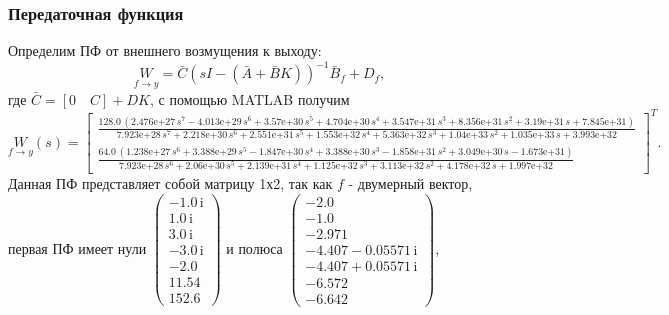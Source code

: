 \subsubsection{Передаточная функция}

Определим ПФ от внешнего возмущения к выходу:
\begin{equation*}
    \underset{f\rightarrow y}{W}=\bar C(sI-(\bar A+\bar BK))^{-1}\bar B_f+D_f,
\end{equation*}
где $\bar C=[0\quad C] + DK$, с помощью MATLAB получим
\begin{equation*}
    \underset{f\rightarrow y}{W}(s)=\begin{bmatrix}
\frac{128.0\,{\left(\text{2.476e+27}\,s^7 -\text{4.013e+29}\,s^6 +\text{3.57e+30}\,s^5 +\text{4.704e+30}\,s^4 +\text{3.547e+31}\,s^3 +\text{8.356e+31}\,s^2 +\text{3.19e+31}\,s+\text{7.845e+31}\right)}}{\text{7.923e+28}\,s^7 +\text{2.218e+30}\,s^6 +\text{2.551e+31}\,s^5 +\text{1.553e+32}\,s^4 +\text{5.363e+32}\,s^3 +\text{1.04e+33}\,s^2 +\text{1.035e+33}\,s+\text{3.993e+32}} \\ \frac{64.0\,{\left(\text{1.238e+27}\,s^6 +\text{3.388e+29}\,s^5 -\text{1.847e+30}\,s^4 +\text{3.388e+30}\,s^3 -\text{1.858e+31}\,s^2 +\text{3.049e+30}\,s-\text{1.673e+31}\right)}}{\text{7.923e+28}\,s^6 +\text{2.06e+30}\,s^5 +\text{2.139e+31}\,s^4 +\text{1.125e+32}\,s^3 +\text{3.113e+32}\,s^2 +\text{4.178e+32}\,s+\text{1.997e+32}}
\end{bmatrix}^T.
\end{equation*}
Данная ПФ представляет собой матрицу 1х2, так как $f$ - двумерный вектор, 
первая ПФ имеет нули $\left(\begin{array}{c}
-1.0\,\mathrm{i}\\
1.0\,\mathrm{i}\\
3.0\,\mathrm{i}\\
-3.0\,\mathrm{i}\\
-2.0\\
11.54\\
152.6
\end{array}\right)$ и полюса $\left(\begin{array}{c}
-2.0\\
-1.0\\
-2.971\\
-4.407-0.05571\,\mathrm{i}\\
-4.407+0.05571\,\mathrm{i}\\
-6.572\\
-6.642
\end{array}\right)$,
